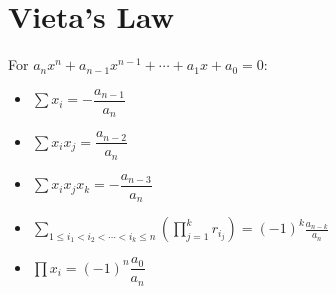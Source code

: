 \section{Vieta's Law}
For $a_{n}x^{n}+a_{n-1}x^{n-1}+\cdots +a_{1}x+a_{0}=0$:
\begin{itemize}
    \item $\sum x_i=-\dfrac{a_{n-1}}{a_n}$
    \item $\sum x_ix_j=\dfrac{a_{n-2}}{a_n}$
    \item $\sum x_ix_jx_k = -\dfrac{a_{n-3}}{a_n}$
    \item $\sum _{1\leq i_{1}<i_{2}<\cdots <i_{k}\leq n}\left(\prod _{j=1}^{k}r_{i_{j}}\right)=(-1)^{k}{\frac {a_{n-k}}{a_{n}}}$
    \item $\prod x_i=(-1)^n\dfrac{a_0}{a_n}$
\end{itemize}